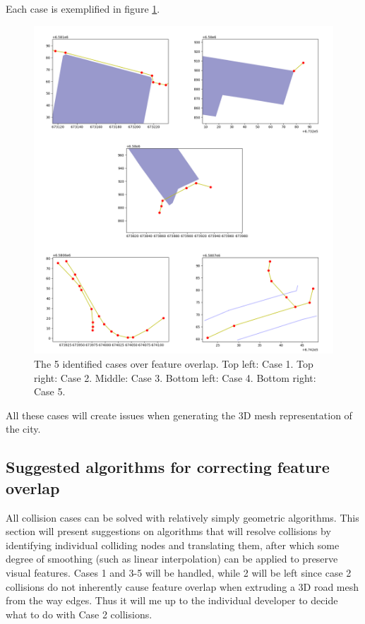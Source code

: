 \documentclass[a4paper]{article}
\begin{document}
Each case is exemplified in figure \ref{fig:collision-cases}.

\begin{figure}[H]
    \centering
    \includegraphics[width=\textwidth,height=0.5\textheight,keepaspectratio]{img_feature_overlap_cases}
    \caption{The 5 identified cases over feature overlap. Top left: Case 1. Top right: Case 2. Middle: Case 3. Bottom left: Case 4. Bottom right: Case 5.}
    \label{fig:collision-cases}
\end{figure}

All these cases will create issues when generating the 3D mesh representation of the city.

\subsection{Suggested algorithms for correcting feature overlap}

All collision cases can be solved with relatively simply geometric algorithms. This section will present suggestions on algorithms that will resolve collisions by identifying individual colliding nodes and translating them, after which some degree of smoothing (such as linear interpolation) can be applied to preserve visual features. Cases 1 and 3-5 will be handled, while 2 will be left since case 2 collisions do not inherently cause feature overlap when extruding a 3D road mesh from the way edges. Thus it will me up to the individual developer to decide what to do with Case 2 collisions.
\end{document}
